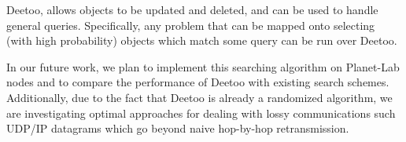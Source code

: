 \documentclass[conference]{IEEEtran}
\begin{document}
Deetoo, allows objects to be updated and deleted, and can
be used to handle general queries.  Specifically, any problem
that can be mapped onto selecting (with high probability) objects
which match some query can be run over Deetoo.

In our future work, we plan to implement this searching algorithm
on Planet-Lab nodes and to compare the performance of Deetoo with
existing search schemes. Additionally, due to the
fact that Deetoo is already a randomized algorithm, we are
investigating optimal approaches for dealing with lossy communications
such UDP/IP datagrams which go beyond naive hop-by-hop retransmission.



\end{document}
